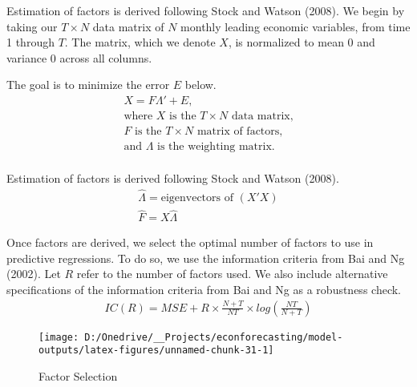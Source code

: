 \documentclass[11pt, letterpaper]{article}\usepackage[]{graphicx}\usepackage[]{color}
\begin{document}
Estimation of factors is derived following Stock and Watson (2008). We begin by taking our $T \times N$ data matrix of $N$ monthly leading economic variables, from time 1 through $T$. The matrix, which we denote $X$, is normalized to mean 0 and variance 0 across all columns.

The goal is to minimize the error $E$ below.
\begin{align*}
	X = F  \Lambda ' + E,\\
	\text{where $X$ is the $T \times N$ data matrix,}\\
	\text{$F$ is the $T \times N$ matrix of factors,}\\
	\text{and $\Lambda$ is the weighting matrix.}\\
\end{align*}

Estimation of factors is derived following Stock and Watson (2008).
\begin{align*}
	\widehat{\Lambda} = \text{eigenvectors of } (X'X)\\
	\widehat{F} = X \widehat{\Lambda}
\end{align*}



Once factors are derived, we select the optimal number of factors to use in predictive regressions. To do so, we use the information criteria from Bai and Ng (2002). Let $R$ refer to the number of factors used. We also include alternative specifications of the information criteria from Bai and Ng as a robustness check.
\begin{align*}
	IC(R) = MSE + R \times \frac{N+T}{NT} \times log\left(\frac{NT}{N+T}\right)
\end{align*}

\begin{figure}[H]

{\centering \texttt{[image: D:/Onedrive/\_\_Projects/econforecasting/model-outputs/latex-figures/unnamed-chunk-31-1]} 

}

\caption[Factor Selection]{Factor Selection}\label{fig:unnamed-chunk-31}
\end{figure}
\end{document}
